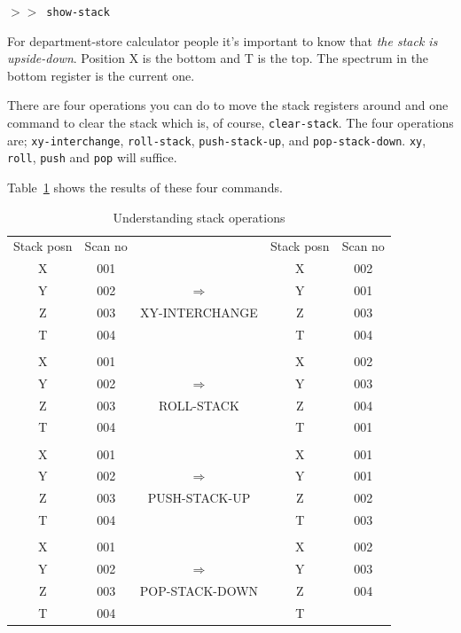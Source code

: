 \documentclass[11pt,twoside]{starlink}
\providecommand{\SP}{{$>\!>$}}
\begin{document}
\SP\ \verb|show-stack|

For department-store calculator people it's important to know that
\emph{the stack is upside-down}. Position X is the bottom and T is the
top.  The spectrum in the bottom register is the current one.

There are four operations you can do to move the stack registers
around and one command to clear the stack which is, of course, \texttt{clear-stack}. The four operations are; \texttt{xy-interchange}, \texttt{roll-stack}, \texttt{push-stack-up}, and \texttt{pop-stack-down}. \texttt{xy},
\texttt{roll}, \texttt{push} and \texttt{pop} will suffice.

Table~\ref{tab:specx_tab1} shows the results of these four commands.

\begin{table}[htb]
\caption{Understanding stack operations}
\begin{center}
\begin{tabular}{ccccc}
Stack posn & Scan no &      & Stack posn & Scan no \\
X & 001 &                                & X & 002 \\
Y & 002 & {\huge $\Longrightarrow$}      & Y & 001 \\
Z & 003 & {\footnotesize XY-INTERCHANGE} & Z & 003 \\
T & 004 &                                & T & 004 \\
  &     &                                &   &     \\
X & 001 &                                & X & 002 \\
Y & 002 & {\huge $\Longrightarrow$}      & Y & 003 \\
Z & 003 & {\footnotesize ROLL-STACK}     & Z & 004 \\
T & 004 &                                & T & 001 \\
  &     &                                &   &     \\
X & 001 &                                & X & 001 \\
Y & 002 & {\huge $\Longrightarrow$}      & Y & 001 \\
Z & 003 & {\footnotesize PUSH-STACK-UP}  & Z & 002 \\
T & 004 &                                & T & 003 \\
  &     &                                &   &     \\
X & 001 &                                & X & 002 \\
Y & 002 & {\huge $\Longrightarrow$}      & Y & 003 \\
Z & 003 & {\footnotesize POP-STACK-DOWN} & Z & 004 \\
T & 004 &                                & T &     \\
\end{tabular}
\label{tab:specx_tab1}
\end{center}
\end{table}
\end{document}
